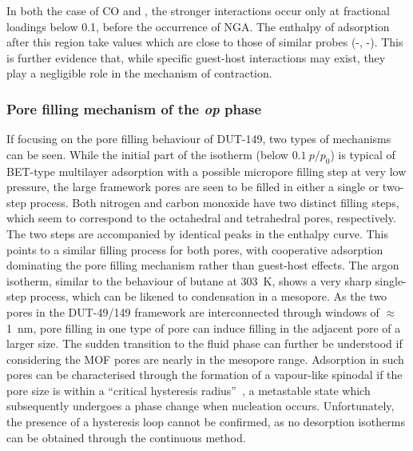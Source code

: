 In both the case of CO and , the 
stronger interactions occur only at fractional loadings below 0.1, 
before the occurrence of \gls{NGA}. The enthalpy of 
adsorption after this region take values which are close to
those of similar probes (-, -).
This is further evidence that, while specific guest-host interactions
may exist, they play a negligible role in the mechanism of contraction.

\subsubsection{Pore filling mechanism of the \textit{op} phase}

If focusing on the pore filling behaviour of DUT-149, two types
of mechanisms can be seen. While the initial part of the isotherm 
(below \(0.1~p/p_0\)) is typical of \gls{BET}-type multilayer adsorption
with a possible micropore filling step at very low pressure,
the large framework pores are seen to be filled in either a single or
two-step process.
Both nitrogen and carbon monoxide have two distinct filling
steps, which seem to correspond to the octahedral and tetrahedral pores,
respectively. The two steps are accompanied by identical 
peaks in the enthalpy curve. This points to a similar 
filling process for both pores, with cooperative adsorption
dominating the pore filling mechanism rather than guest-host 
effects. The argon isotherm, similar to the behaviour of 
butane at \SI{303}{\kelvin}, shows a very sharp single-step process,
which can be likened to condensation in a mesopore. As the 
two pores in the DUT-49/149 framework are interconnected through 
windows of \(\approx\)\SI{1}{\nano\metre}, pore filling 
in one type of pore can induce filling in the adjacent pore of 
a larger size. The sudden transition to the fluid phase can further
be understood if considering the \gls{MOF} pores are nearly in the mesopore 
range. Adsorption in such pores can be characterised through 
the formation of a vapour-like spinodal if the pore size is within
a ``critical hysteresis radius''~\cite{hiratsukaCriticalEnergyBarrier2016},
a metastable state which subsequently undergoes a phase change when
nucleation occurs. Unfortunately, the presence of a hysteresis loop
cannot be confirmed, as no desorption isotherms can be obtained 
through the continuous method.

